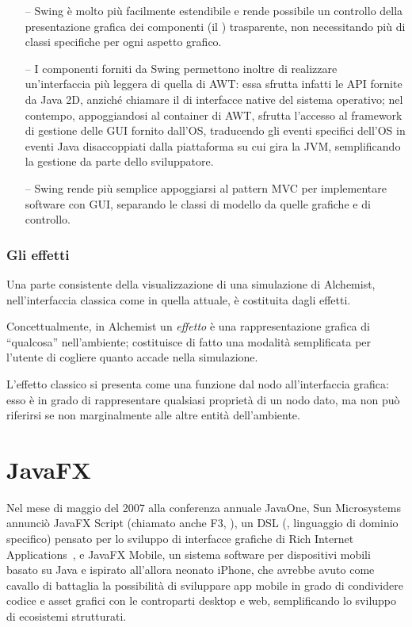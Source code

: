                 \begin{itemize}
                    \item[--]
                        Swing è molto più facilmente estendibile e rende possibile un controllo della presentazione grafica dei componenti (il ) trasparente, non necessitando più di classi specifiche per ogni aspetto grafico.
                    \item[--]
                        I componenti forniti da Swing permettono inoltre di realizzare un'interfaccia più leggera di quella di AWT:
                        essa sfrutta infatti le API fornite da Java 2D, anziché chiamare il  di interfacce native del sistema operativo;
                        nel contempo, appoggiandosi al container di AWT, sfrutta l'accesso al framework di gestione delle GUI fornito dall'OS, traducendo gli eventi specifici dell'OS in eventi Java disaccoppiati dalla piattaforma su cui gira la JVM, semplificando la gestione da parte dello sviluppatore.
                    \item[--]
                        Swing rende più semplice appoggiarsi al pattern MVC per implementare software con GUI, separando le classi di modello da quelle grafiche e di controllo.
                \end{itemize}

            \subsubsection{Gli effetti}\label{subsubsec:effect}
                Una parte consistente della visualizzazione di una simulazione di Alchemist, nell'interfaccia classica come in quella attuale, è costituita dagli effetti.

                Concettualmente, in Alchemist un \emph{effetto} è una rappresentazione grafica di ``qualcosa'' nell'ambiente;
                costituisce di fatto una modalità semplificata per l'utente di cogliere quanto accade nella simulazione.

                L'effetto classico si presenta  come una funzione dal nodo all'interfaccia grafica:
                esso è in grado di rappresentare qualsiasi proprietà di un nodo dato, ma non può riferirsi se non marginalmente alle altre entità dell'ambiente.

    \section{JavaFX}\label{sec:jfx}
        Nel mese di maggio del 2007 alla conferenza annuale JavaOne, Sun Microsystems annunciò JavaFX Script (chiamato anche F3, ), un DSL (, linguaggio di dominio specifico) pensato per lo sviluppo di interfacce grafiche di Rich Internet Applications~\cite{moritz2008rich}, e JavaFX Mobile, un sistema software per dispositivi mobili basato su Java e ispirato all'allora neonato iPhone, che avrebbe avuto come cavallo di battaglia la possibilità di sviluppare app mobile in grado di condividere codice e asset grafici con le controparti desktop e web, semplificando lo sviluppo di ecosistemi strutturati.

